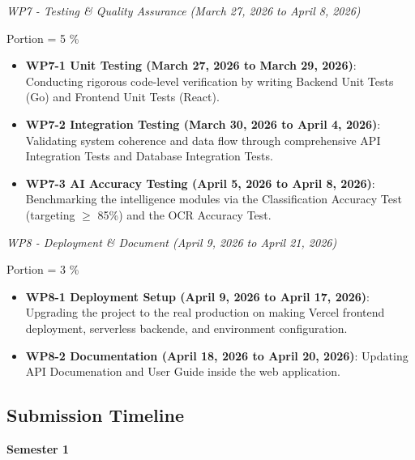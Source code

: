 \documentclass[12pt,oneside,openright,a4paper]{cpe-english-project}
\begin{document}
\vspace{1em}

\emph{WP7 - Testing \& Quality Assurance (March 27, 2026 to April 8, 2026)}

Portion = 5 \%

\begin{itemize}
\item \textbf{WP7-1 Unit Testing (March 27, 2026 to March 29, 2026)}: Conducting rigorous code-level verification by writing Backend Unit Tests (Go) and Frontend Unit Tests (React).
\item \textbf{WP7-2 Integration Testing (March 30, 2026 to April 4, 2026)}: Validating system coherence and data flow through comprehensive API Integration Tests and Database Integration Tests.
\item \textbf{WP7-3 AI Accuracy Testing (April 5, 2026 to April 8, 2026)}: Benchmarking the intelligence modules via the Classification Accuracy Test (targeting $\ge$ 85\%) and the OCR Accuracy Test.
\end{itemize}

\vspace{1em}

\emph{WP8 - Deployment \& Document (April 9, 2026 to April 21, 2026)}

Portion = 3 \% 

\begin{itemize}
\item \textbf{WP8-1 Deployment Setup (April 9, 2026 to April 17, 2026)}: Upgrading the project to the real production on making Vercel frontend deployment, serverless backende, and environment configuration.
\item \textbf{WP8-2 Documentation (April 18, 2026 to April 20, 2026)}: Updating API Documenation and User Guide inside the web application.
\end{itemize}

\vspace{1em}

\subsection{\texorpdfstring{\textbf{Submission Timeline}}{Submission Timeline}}

\textbf{Semester 1}
\end{document}

